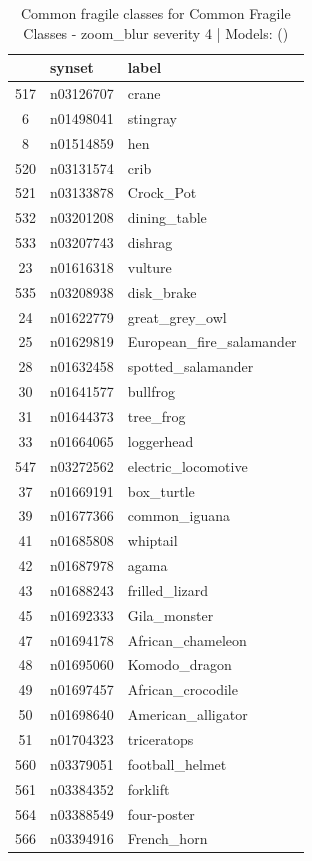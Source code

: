 \begin{table}
\caption{Common fragile classes for Common Fragile Classes - zoom_blur severity 4 | Models: ()}
\label{tab:Common Fragile Classes - zoom_blur severity 4_d41d8cd9}
\begin{tabular}{cll}
\toprule
 & synset & label \\
\midrule
517 & n03126707 & crane \\
6 & n01498041 & stingray \\
8 & n01514859 & hen \\
520 & n03131574 & crib \\
521 & n03133878 & Crock_Pot \\
532 & n03201208 & dining_table \\
533 & n03207743 & dishrag \\
23 & n01616318 & vulture \\
535 & n03208938 & disk_brake \\
24 & n01622779 & great_grey_owl \\
25 & n01629819 & European_fire_salamander \\
28 & n01632458 & spotted_salamander \\
30 & n01641577 & bullfrog \\
31 & n01644373 & tree_frog \\
33 & n01664065 & loggerhead \\
547 & n03272562 & electric_locomotive \\
37 & n01669191 & box_turtle \\
39 & n01677366 & common_iguana \\
41 & n01685808 & whiptail \\
42 & n01687978 & agama \\
43 & n01688243 & frilled_lizard \\
45 & n01692333 & Gila_monster \\
47 & n01694178 & African_chameleon \\
48 & n01695060 & Komodo_dragon \\
49 & n01697457 & African_crocodile \\
50 & n01698640 & American_alligator \\
51 & n01704323 & triceratops \\
560 & n03379051 & football_helmet \\
561 & n03384352 & forklift \\
564 & n03388549 & four-poster \\
566 & n03394916 & French_horn \\

\end{tabular}
\end{table}
